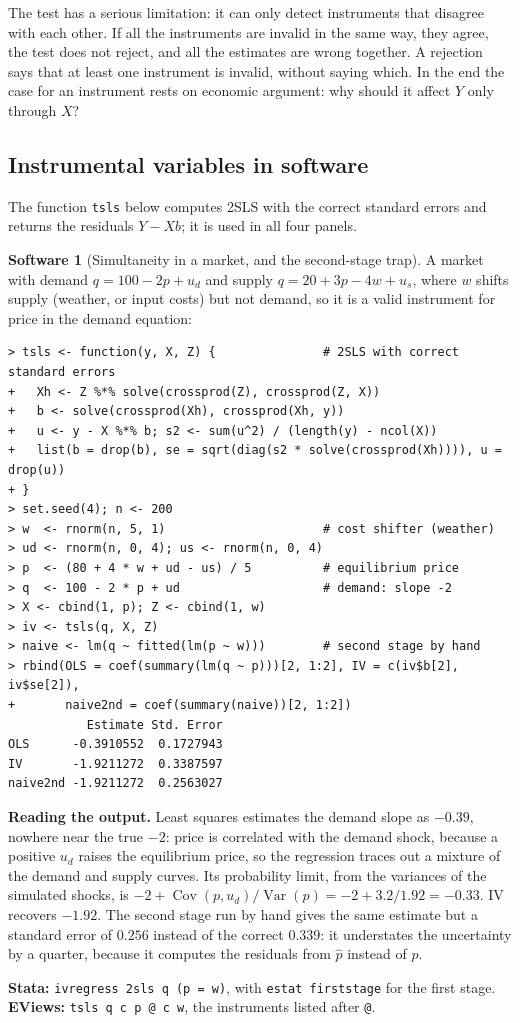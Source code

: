 \documentclass[11pt,a4paper]{article}
\numberwithin{equation}{section}
\DeclareMathOperator{\Var}{Var}
\DeclareMathOperator{\Cov}{Cov}
\theoremstyle{definition}
\newtheorem{software}[thm]{Software}
\begin{document}
The test has a serious limitation: it can only detect instruments that disagree with each other. If all the instruments are invalid in the same
way, they agree, the test does not reject, and all the estimates are wrong together. A rejection says that at least one instrument is invalid,
without saying which. In the end the case for an instrument rests on economic argument: why should it affect $Y$ only through $X$?

\subsection{Instrumental variables in software}
\label{ssec:software13}

The function \texttt{tsls} below computes 2SLS with the correct standard errors and returns the residuals $Y - Xb$; it is used in all four panels.

\begin{software}[Simultaneity in a market, and the second-stage trap]
\label{sw:market}
A market with demand $q = 100 - 2p + u_d$ and supply $q = 20 + 3p - 4w + u_s$, where $w$ shifts supply (weather, or input costs) but not demand, so it
is a valid instrument for price in the demand equation:
{\small\begin{verbatim}
> tsls <- function(y, X, Z) {               # 2SLS with correct standard errors
+   Xh <- Z %*% solve(crossprod(Z), crossprod(Z, X))
+   b <- solve(crossprod(Xh), crossprod(Xh, y))
+   u <- y - X %*% b; s2 <- sum(u^2) / (length(y) - ncol(X))
+   list(b = drop(b), se = sqrt(diag(s2 * solve(crossprod(Xh)))), u = drop(u))
+ }
> set.seed(4); n <- 200
> w  <- rnorm(n, 5, 1)                      # cost shifter (weather)
> ud <- rnorm(n, 0, 4); us <- rnorm(n, 0, 4)
> p  <- (80 + 4 * w + ud - us) / 5          # equilibrium price
> q  <- 100 - 2 * p + ud                    # demand: slope -2
> X <- cbind(1, p); Z <- cbind(1, w)
> iv <- tsls(q, X, Z)
> naive <- lm(q ~ fitted(lm(p ~ w)))        # second stage by hand
> rbind(OLS = coef(summary(lm(q ~ p)))[2, 1:2], IV = c(iv$b[2], iv$se[2]),
+       naive2nd = coef(summary(naive))[2, 1:2])
           Estimate Std. Error
OLS      -0.3910552  0.1727943
IV       -1.9211272  0.3387597
naive2nd -1.9211272  0.2563027
\end{verbatim}}
\textbf{Reading the output.} Least squares estimates the demand slope as $-0.39$, nowhere near the true $-2$: price is correlated with the demand shock,
because a positive $u_d$ raises the equilibrium price, so the regression traces out a mixture of the demand and supply curves. Its probability limit,
from the variances of the simulated shocks, is $-2 + \Cov(p, u_d)/\Var(p) = -2 + 3.2/1.92 = -0.33$. IV recovers $-1.92$. The second stage run by hand gives the
same estimate but a standard error of $0.256$ instead of the correct $0.339$: it understates the uncertainty by a quarter, because it computes the
residuals from $\hat p$ instead of $p$.

\textbf{Stata:} \texttt{ivregress 2sls q (p = w)}, with \texttt{estat firststage} for the first stage. \textbf{EViews:} \texttt{tsls q c p @ c w}, the instruments listed after \texttt{@}.
\end{software}
\end{document}
